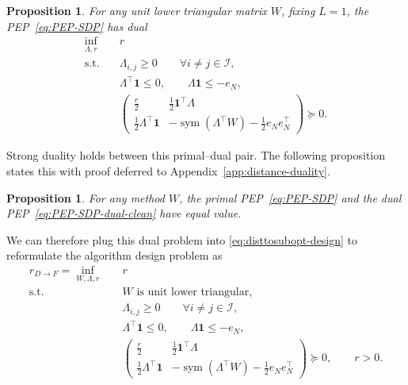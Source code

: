 \documentclass[11pt]{article}
\newtheorem{proposition}[thm]{Proposition}
\begin{document}
\begin{proposition}\label{prop:distance-dual}
For any unit lower triangular matrix $W$, fixing $L=1$, the PEP~\eqref{eq:PEP-SDP} has dual
\begin{equation} \label{eq:PEP-SDP-dual-clean}
\begin{aligned}
    \inf_{\Lambda,r}\quad & r\\
    \mathrm{s.t.}\quad
    &\Lambda_{i,j}\geq0
    \qquad \forall i\neq j\in\mathcal I,\\
    &\Lambda^\top\mathbf1\leq0,
    \qquad
    \Lambda\mathbf1\leq-e_N,\\
    &\begin{pmatrix}
        \frac r2 & \frac12\mathbf1^\top\Lambda\\[1mm]
        \frac12\Lambda^\top\mathbf1
        &-\operatorname{sym}(\Lambda^\top W)-\frac12e_Ne_N^\top
    \end{pmatrix}\succeq0.
\end{aligned}
\end{equation}
\end{proposition}
\noindent Strong duality holds between this primal--dual pair. The following proposition states this with proof deferred to Appendix~\ref{app:distance-duality}.
\begin{proposition}\label{prop:distance-duality}
For any method $W$, the primal PEP~\eqref{eq:PEP-SDP} and the dual PEP~\eqref{eq:PEP-SDP-dual-clean} have equal value.
\end{proposition}

\noindent We can therefore plug this dual problem into
\eqref{eq:disttosubopt-design} to reformulate the algorithm design problem as
\begin{equation}\label{eq:disttosubopt-form2}
\begin{aligned}
    r_{D\rightarrow F}
    =\inf_{W,\Lambda,r}\quad & r\\
    \mathrm{s.t.}\quad
    &W\text{ is unit lower triangular},\\
    &\Lambda_{i,j}\geq0
    \qquad \forall i\neq j\in\mathcal I,\\
    &\Lambda^\top\mathbf1\leq0,
    \qquad
    \Lambda\mathbf1\leq-e_N,\\
    &\begin{pmatrix}
        \frac r2 & \frac12\mathbf1^\top\Lambda\\[1mm]
        \frac12\Lambda^\top\mathbf1
        &-\operatorname{sym}(\Lambda^\top W)-\frac12e_Ne_N^\top
    \end{pmatrix}\succeq0,
    \qquad r>0.
\end{aligned}
\end{equation}
\end{document}
